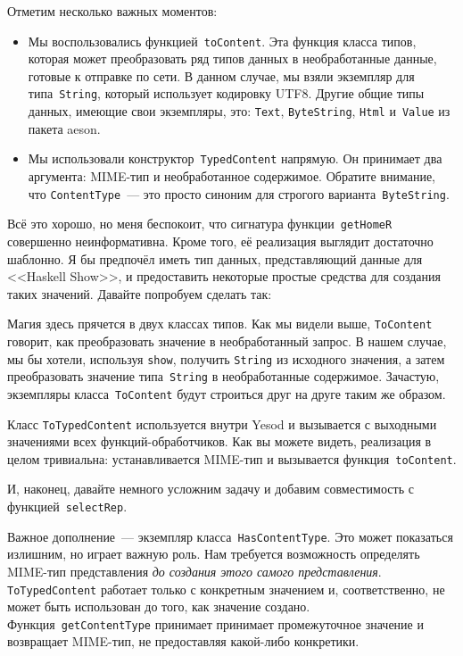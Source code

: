 Отметим несколько важных моментов:
\begin{itemize}
    \item Мы воспользовались функцией~\lstinline'toContent'. Эта функция класса
        типов, которая может преобразовать ряд типов данных в необработанные
        данные, готовые к отправке по сети. В данном случае, мы взяли экземпляр
        для типа~\lstinline'String', который использует кодировку UTF8. Другие
        общие типы данных, имеющие свои экземпляры, это: \lstinline'Text',
        \lstinline'ByteString', \lstinline'Html' и~\lstinline'Value' из пакета
        aeson.
    \item Мы использовали конструктор~\lstinline'TypedContent' напрямую. Он
        принимает два аргумента: MIME-тип и необработанное содержимое. Обратите
        внимание, что \lstinline'ContentType'~--- это просто синоним для
        строгого варианта~\lstinline'ByteString'.
\end{itemize}

Всё это хорошо, но меня беспокоит, что сигнатура функции~\lstinline'getHomeR'
совершенно неинформативна. Кроме того, её реализация выглядит достаточно
шаблонно. Я бы предпочёл иметь тип данных, представляющий данные для <<Haskell
Show>>, и предоставить некоторые простые средства для создания таких значений.
Давайте попробуем сделать так:


Магия здесь прячется в двух классах типов. Как мы видели выше,
\lstinline'ToContent' говорит, как преобразовать значение в необработанный
запрос. В нашем случае, мы бы хотели, используя \lstinline'show', получить
\lstinline'String' из исходного значения, а затем преобразовать значение
типа~\lstinline'String' в необработанные содержимое. Зачастую, экземпляры
класса~\lstinline'ToContent' будут строиться друг на друге таким же образом.

Класс \lstinline'ToTypedContent' используется внутри Yesod и вызывается с
выходными значениями всех функций-обработчиков. Как вы можете видеть,
реализация в целом тривиальна: устанавливается MIME-тип и вызывается
функция~\lstinline'toContent'.

И, наконец, давайте немного усложним задачу и добавим совместимость с
функцией~\lstinline'selectRep'.


Важное дополнение~--- экземпляр класса~\lstinline'HasContentType'. Это может
показаться излишним, но играет важную роль. Нам требуется возможность
определять MIME-тип представления \emph{до создания этого самого
    представления}. \lstinline'ToTypedContent' работает только с конкретным
значением и, соответственно, не может быть использован до того, как значение
создано. Функция~\lstinline'getContentType' принимает принимает промежуточное
значение и возвращает MIME-тип, не предоставляя какой-либо конкретики.

